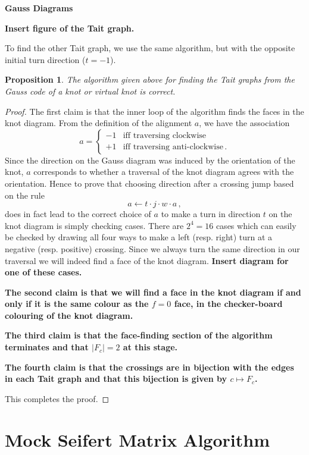 \documentclass[12pt]{report}
\newcommand{\notered}[1]{{\color{Red} \textbf{#1}}}
\newcommand{\notegreen}[1]{{\color{Green} \textbf{#1}}}
\newtheorem*{proposition}{Proposition}
\begin{document}
	\notered{Gauss Diagrams}
	
	\notegreen{Insert figure of the Tait graph.}
	
	To find the other Tait graph, we use the same algorithm, but with the opposite initial turn direction ($t = -1$).
	
	\begin{proposition}
		The algorithm given above for finding the Tait graphs from the Gauss code of a knot or virtual knot is correct.
	\end{proposition}
	\begin{proof}
		The first claim is that the inner loop of the algorithm finds the faces in the knot diagram. From the definition of the alignment $a$, we have the association
		\[a = \begin{cases}
			-1 & \text{iff traversing clockwise} \\
			+1 & \text{iff traversing anti-clockwise}\,.
		\end{cases}\]
		Since the direction on the Gauss diagram was induced by the orientation of the knot, $a$ corresponds to whether a traversal of the knot diagram agrees with the orientation. Hence to prove that choosing direction after a crossing jump based on the rule
		\[a \leftarrow t \cdot j \cdot w \cdot a\,,\]
		does in fact lead to the correct choice of $a$ to make a turn in direction $t$ on the knot diagram is simply checking cases. There are $2^{4} = 16$ cases which can easily be checked by drawing all four ways to make a left (resp. right) turn at a negative (resp. positive) crossing. Since we always turn the same direction in our traversal we will indeed find a face of the knot diagram. \notegreen{Insert diagram for one of these cases.}
		
		\notegreen{The second claim is that we will find a face in the knot diagram if and only if it is the same colour as the $f = 0$ face, in the checker-board colouring of the knot diagram.}
		
		\notegreen{The third claim is that the face-finding section of the algorithm terminates and that $|F_{c}| = 2$ at this stage.}
		
		\notegreen{The fourth claim is that the crossings are in bijection with the edges in each Tait graph and that this bijection is given by $c \mapsto F_{c}$.}
		
		This completes the proof. \qedhere
		
	\end{proof}

\section{Mock Seifert Matrix Algorithm}
\end{document}
